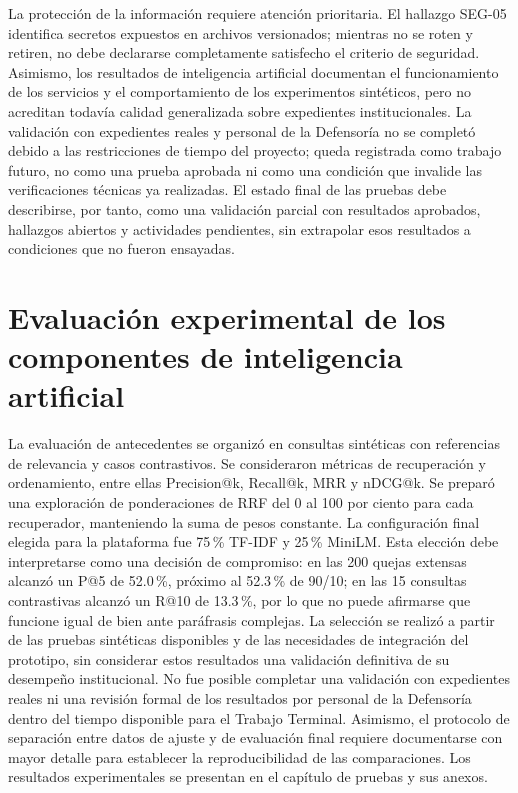 La protección de la información requiere atención prioritaria. El hallazgo
SEG-05 identifica secretos expuestos en archivos versionados; mientras no se
roten y retiren, no debe declararse completamente satisfecho el criterio de
seguridad. Asimismo, los resultados de inteligencia artificial documentan el
funcionamiento de los servicios y el comportamiento de los experimentos
sintéticos, pero no acreditan todavía calidad generalizada sobre expedientes
institucionales. La validación con expedientes reales y personal de la
Defensoría no se completó debido a las restricciones de tiempo del proyecto;
queda registrada como trabajo futuro, no como una prueba aprobada ni como una
condición que invalide las verificaciones técnicas ya realizadas. El estado
final de las pruebas debe describirse, por tanto, como una validación parcial
con resultados aprobados, hallazgos abiertos y actividades pendientes, sin
extrapolar esos resultados a condiciones que no fueron ensayadas.


\section{Evaluación experimental de los componentes de inteligencia artificial}
\label{sec:eval_ia}
La evaluación de antecedentes se organizó en consultas sintéticas con
referencias de relevancia y casos contrastivos. Se consideraron métricas de
recuperación y ordenamiento, entre ellas Precision@k, Recall@k, MRR y nDCG@k.
Se preparó una exploración de ponderaciones de RRF del 0 al 100 por ciento
para cada recuperador, manteniendo la suma de pesos constante. La configuración
final elegida para la plataforma fue 75\,\% TF-IDF y 25\,\% MiniLM.
Esta elección debe interpretarse como una decisión de compromiso: en las 200
quejas extensas alcanzó un P@5 de 52.0\,\%, próximo al 52.3\,\% de 90/10;
en las 15 consultas contrastivas alcanzó un R@10 de 13.3\,\%, por lo que
no puede afirmarse que funcione igual de bien ante paráfrasis complejas.
La selección se realizó a partir de las pruebas sintéticas disponibles y de las
necesidades de integración del prototipo, sin considerar estos resultados una
validación definitiva de su desempeño institucional. No fue posible completar
una validación con expedientes reales ni una revisión formal de los resultados
por personal de la Defensoría dentro del tiempo disponible para el Trabajo
Terminal. Asimismo, el protocolo de separación entre datos de ajuste y de
evaluación final requiere documentarse con mayor detalle para establecer
la reproducibilidad de las comparaciones. Los resultados experimentales se
presentan en el capítulo de pruebas y sus anexos.

